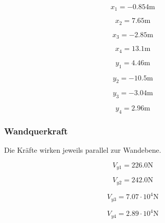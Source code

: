 \documentclass[
  letterpaper,
  DIV=11]{scrreprt}
\begin{document}
\begin{equation*}x_{1} = - 0.854 \text{m}\end{equation*}

\begin{equation*}x_{2} = 7.65 \text{m}\end{equation*}

\begin{equation*}x_{3} = - 2.85 \text{m}\end{equation*}

\begin{equation*}x_{4} = 13.1 \text{m}\end{equation*}

\begin{equation*}y_{1} = 4.46 \text{m}\end{equation*}

\begin{equation*}y_{2} = - 10.5 \text{m}\end{equation*}

\begin{equation*}y_{3} = - 3.04 \text{m}\end{equation*}

\begin{equation*}y_{4} = 2.96 \text{m}\end{equation*}

\hypertarget{wandquerkraft}{%
\subsubsection{Wandquerkraft}\label{wandquerkraft}}

Die Kräfte wirken jeweils parallel zur Wandebene.

\begin{equation*}V_{y1} = 226.0 \text{N}\end{equation*}

\begin{equation*}V_{y2} = 242.0 \text{N}\end{equation*}

\begin{equation*}V_{y3} = 7.07 \cdot 10^{4} \text{N}\end{equation*}

\begin{equation*}V_{y4} = 2.89 \cdot 10^{4} \text{N}\end{equation*}
\end{document}
